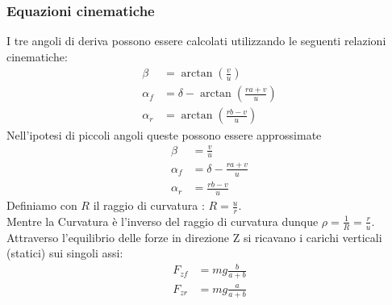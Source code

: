 \subsubsection{Equazioni cinematiche}
I tre angoli di deriva possono essere calcolati utilizzando le seguenti relazioni cinematiche:
\begin{align}
\beta & = \arctan(\frac{v}{u})\\
\alpha_f & = \delta - \arctan(\frac{ra+v}{u})\\
\alpha_r & = \arctan(\frac{rb-v}{u})
\end{align}
Nell'ipotesi di piccoli angoli queste possono essere approssimate
\begin{align}
\beta & = \frac{v}{u}\\
\alpha_f & = \delta - \frac{ra+v}{u} \label{eq:alfa front} \\
\alpha_r & = \frac{rb-v}{u} \label{eq: alfa rear}
\end{align}
Definiamo con $R$ il raggio di curvatura : $R=\frac{u}{r}$.\\
Mentre la Curvatura è l'inverso del raggio di curvatura dunque $\rho = \frac{1}{R} = \frac{r}{u}$.\\
Attraverso l'equilibrio delle forze in direzione Z si ricavano i carichi verticali (statici) sui singoli assi:
\begin{align}
F_{zf} & = mg \frac{b}{a+b}\\
F_{zr} & = mg \frac{a}{a+b}
\end{align}

